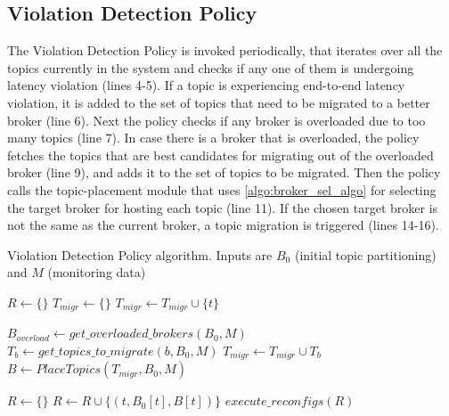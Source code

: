 \subsection{Violation Detection Policy}
The Violation Detection Policy is invoked periodically, that iterates over all the topics currently in the system and checks if any one of them is undergoing latency violation (lines 4-5). If a topic is experiencing end-to-end latency violation, it is added to the set of topics that need to be migrated to a better broker (line 6). Next the policy checks if any broker is overloaded due to too many topics (line 7). In case there is a broker that is overloaded, the policy fetches the topics that are best candidates for migrating out of the overloaded broker (line 9), and adds it to the set of topics to be migrated. Then the policy calls the topic-placement module that uses \cref{algo:broker_sel_algo} for selecting the target broker for hosting each topic (line 11). If the chosen target broker is not the same as the current broker, a topic migration is triggered (lines 14-16).
\begin{algorithm}
\caption{Violation Detection Policy algorithm. Inputs are $B_0$ (initial topic partitioning) and $M$ (monitoring data)}\label{viol_detection_algo}
\begin{algorithmic}[1]
\State $R \gets \{\}$ 
\State $T_{migr} \gets \{\}$ 
        \State $T_{migr} \gets T_{migr} \cup \{ t \}$
    \EndIf
\EndFor

\State $B_{overload} \gets get\_overloaded\_brokers \left( B_0, M \right)$
 
    \State $T_b \gets get\_topics\_to\_migrate\left(b, B_0, M\right)$
    \State $T_{migr} \gets T_{migr} \cup T_b$
\EndFor
\State $B \gets PlaceTopics \left( T_{migr}, B_0, M \right)$ 

\State $R \gets \{\}$ 
        \State $R \gets R \cup \{ \left( t, B_0 \left[ t \right], B \left[ t \right]\right) \}$ 
    \EndIf
\EndFor
\State $execute\_reconfigs \left( R \right)$ 
\EndProcedure
\end{algorithmic}
\end{algorithm}

